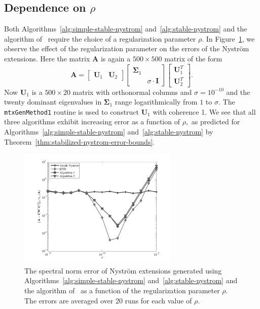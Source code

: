 \documentclass[11pt,letterpaper,twoside,reqno,nosumlimits]{amsart}
\def\transp{T}
\newcommand{\mat}[1]{\ensuremath{\mathbf{#1}}}
\theoremstyle{remark}
\begin{document}
\subsection*{Dependence on $\rho$}
Both Algorithms~\ref{alg:simple-stable-nystrom} and~\ref{alg:stable-nystrom} and the algorithm of~\cite{CD11} require the choice of a regularization parameter $\rho.$ In Figure~\ref{fig:regularization}, we observe the effect of the regularization parameter on the errors of the Nystr\"om extensions. Here the matrix $\mat{A}$ is again a $500 \times 500$ matrix of the form
\[
\mat{A} = [\begin{matrix} \mat{U}_1 & \mat{U}_2 \end{matrix}] 
 \left[ \begin{matrix} \mat{\Sigma}_1 & \\ & \sigma \cdot \mat{I} \end{matrix} \right]
 \left[ \begin{matrix} \mat{U}_1^\transp \\ \mat{U}_2^\transp \end{matrix} \right].
\]
Now $\mat{U}_1$ is a $500 \times 20$ matrix with orthonormal columns and $\sigma = 10^{-10}$ and the twenty dominant eigenvalues in $\mat{\Sigma}_1$ range logarithmically from $1$ to $\sigma.$ The \texttt{mtxGenMethod1} routine is used to construct $\mat{U}_1$ with coherence 1. We see that all three algorithms exhibit increasing error as a function of $\rho,$ as predicted for Algorithms~\ref{alg:simple-stable-nystrom} and~\ref{alg:stable-nystrom} by Theorem~\ref{thm:stabilized-nystrom-error-bounds}. 

\begin{figure}[ht]
 \centering
 \includegraphics[width=3in,keepaspectratio=true]{./experiments/regularizationdependence.pdf}
 \caption{The spectral norm error of Nystr\"om extensions generated using Algorithms~\ref{alg:simple-stable-nystrom} and~\ref{alg:stable-nystrom} and the algorithm of~\cite{CD11} as a function of the regularization parameter $\rho.$ The errors are averaged over 20 runs for each value of $\rho.$}
 \label{fig:regularization}
\end{figure}

\clearpage


\end{document}
